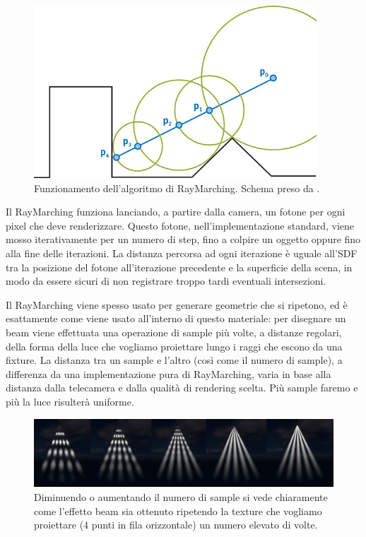 \documentclass[main.tex]{subfiles}
\begin{document}
\begin{figure}
    \centering
    \captionsetup{justification=centering}
    \includegraphics[scale=0.65]{img/renderingPipeline/spheretrace.jpg}
    \caption{Funzionamento dell'algoritmo di RayMarching. Schema preso da \cite{fig_2_rayMarchSchema}.}
    \label{fig:2_raymarchWikipedia} %
\end{figure}
Il RayMarching funziona lanciando, a partire dalla camera, un fotone per ogni pixel che deve renderizzare. Questo fotone, nell'implementazione standard, viene mosso iterativamente per un numero di step, fino a colpire un oggetto oppure fino alla fine delle iterazioni. La distanza percorsa ad ogni iterazione è uguale all'SDF tra la posizione del fotone all'iterazione precedente e la superficie della scena, in modo da essere sicuri di non registrare troppo tardi eventuali intersezioni.\newline

Il RayMarching viene spesso usato per generare geometrie che si ripetono, ed è esattamente come viene usato all'interno di questo materiale: per disegnare un beam viene effettuata una operazione di sample più volte, a distanze regolari, della forma della luce che vogliamo proiettare lungo i raggi che escono da una fixture. La distanza tra un sample e l'altro (così come il numero di sample), a differenza da una implementazione pura di RayMarching, varia in base alla distanza dalla telecamera e dalla qualità di rendering scelta. Più sample faremo e più la luce risulterà uniforme. 
\begin{figure}[H]
    \centering
    \includegraphics[width=1\linewidth]{img/renderingPipeline/renderingQuality.jpg}
    \caption{Diminuendo o aumentando il numero di sample si vede chiaramente come l'effetto beam sia ottenuto ripetendo la texture che vogliamo proiettare (4 punti in fila orizzontale) un numero elevato di volte.}
    \label{fig:2_raymarchQualities}
\end{figure}
\end{document}
